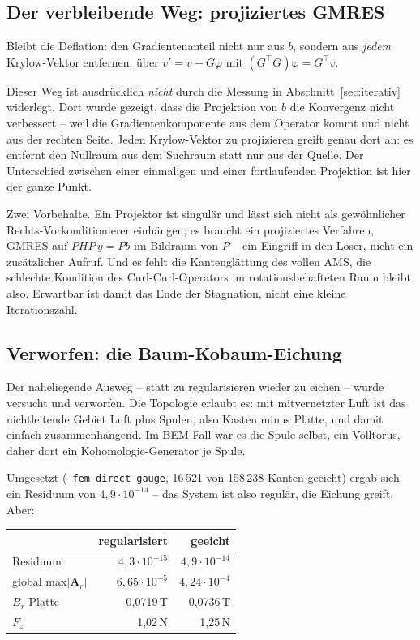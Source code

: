\documentclass[11pt,a4paper]{article}
\newcommand{\Ar}{\mathbf{A}_r}
\begin{document}
\subsection{Der verbleibende Weg: projiziertes GMRES}

Bleibt die Deflation: den Gradientenanteil nicht nur aus $b$, sondern aus
\emph{jedem} Krylow-Vektor entfernen, über
$v' = v - G\varphi$ mit $(G^{\!\top}G)\varphi = G^{\!\top}v$.

Dieser Weg ist ausdrücklich \emph{nicht} durch die Messung in
Abschnitt~\ref{sec:iterativ} widerlegt. Dort wurde gezeigt, dass die
Projektion von $b$ die Konvergenz nicht verbessert -- weil die
Gradientenkomponente aus dem Operator kommt und nicht aus der rechten Seite.
Jeden Krylow-Vektor zu projizieren greift genau dort an: es entfernt den
Nullraum aus dem Suchraum statt nur aus der Quelle. Der Unterschied zwischen
einer einmaligen und einer fortlaufenden Projektion ist hier der ganze Punkt.

Zwei Vorbehalte. Ein Projektor ist singulär und lässt sich nicht als
gewöhnlicher Rechts-Vorkonditionierer einhängen; es braucht ein projiziertes
Verfahren, GMRES auf $PHP\,y = Pb$ im Bildraum von $P$ -- ein Eingriff in den
Löser, nicht ein zusätzlicher Aufruf. Und es fehlt die Kantenglättung des
vollen AMS, die schlechte Kondition des Curl-Curl-Operators im
rotationsbehafteten Raum bleibt also. Erwartbar ist damit das Ende der
Stagnation, nicht eine kleine Iterationszahl.

\subsection{Verworfen: die Baum-Kobaum-Eichung}
\label{sec:baum}

Der naheliegende Ausweg -- statt zu regularisieren wieder zu eichen -- wurde
versucht und verworfen. Die Topologie erlaubt es: mit mitvernetzter Luft ist
das nichtleitende Gebiet Luft plus Spulen, also Kasten minus Platte, und damit
einfach zusammenhängend. Im BEM-Fall war es die Spule selbst, ein Volltorus,
daher dort ein Kohomologie-Generator je Spule.

Umgesetzt (\texttt{--fem-direct-gauge}, 16\,521 von 158\,238 Kanten geeicht)
ergab sich ein Residuum von $4{,}9\cdot10^{-14}$ -- das System ist also
regulär, die Eichung greift. Aber:
\begin{center}
\begin{tabular}{lrr}
\toprule
 & regularisiert & geeicht \\
\midrule
Residuum & $4{,}3\cdot10^{-15}$ & $4{,}9\cdot10^{-14}$ \\
global max$|\Ar|$ & $6{,}65\cdot10^{-5}$ & $4{,}24\cdot10^{-4}$ \\
$B_r$ Platte & 0,0719\,T & 0,0736\,T \\
$F_z$ & 1,02\,N & 1,25\,N \\
\bottomrule
\end{tabular}
\end{center}
\end{document}
